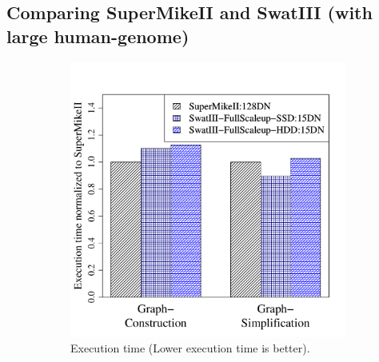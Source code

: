 \documentclass[10pt, conference, compsocconf]{IEEEtran}
\begin{document}
\subsection {Comparing SuperMikeII and SwatIII (with large human-genome)} \label{SecPerfDiffArchHum}
\vspace{-1.9em}
\begin{figure}[htb]
\center
        \begin{subfigure}[b]{0.23\textwidth}
                \includegraphics[width=\textwidth]{Figure/PerormanceData/Plots/PerfDiffArchHum.pdf}
                \caption{Execution time (Lower execution time is better).}
                \label{fig:DifferentArchitecturesPerfHum}
        \end{subfigure}
        \begin{subfigure}[b]{0.23\textwidth}

\end{subfigure}
\end{figure}
\end{document}
